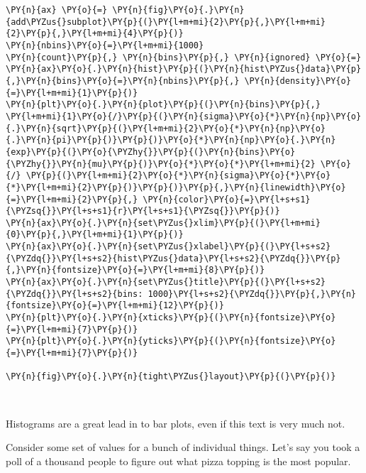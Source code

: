 \begin{tcolorbox}[breakable, size=fbox, boxrule=1pt, pad at break*=1mm,colback=cellbackground, colframe=cellborder]
\begin{Verbatim}[commandchars=\\\{\}]
\PY{n}{ax} \PY{o}{=} \PY{n}{fig}\PY{o}{.}\PY{n}{add\PYZus{}subplot}\PY{p}{(}\PY{l+m+mi}{2}\PY{p}{,}\PY{l+m+mi}{2}\PY{p}{,}\PY{l+m+mi}{4}\PY{p}{)}
\PY{n}{nbins}\PY{o}{=}\PY{l+m+mi}{1000}
\PY{n}{count}\PY{p}{,} \PY{n}{bins}\PY{p}{,} \PY{n}{ignored} \PY{o}{=} \PY{n}{ax}\PY{o}{.}\PY{n}{hist}\PY{p}{(}\PY{n}{hist\PYZus{}data}\PY{p}{,}\PY{n}{bins}\PY{o}{=}\PY{n}{nbins}\PY{p}{,} \PY{n}{density}\PY{o}{=}\PY{l+m+mi}{1}\PY{p}{)}
\PY{n}{plt}\PY{o}{.}\PY{n}{plot}\PY{p}{(}\PY{n}{bins}\PY{p}{,} \PY{l+m+mi}{1}\PY{o}{/}\PY{p}{(}\PY{n}{sigma}\PY{o}{*}\PY{n}{np}\PY{o}{.}\PY{n}{sqrt}\PY{p}{(}\PY{l+m+mi}{2}\PY{o}{*}\PY{n}{np}\PY{o}{.}\PY{n}{pi}\PY{p}{)}\PY{p}{)}\PY{o}{*}\PY{n}{np}\PY{o}{.}\PY{n}{exp}\PY{p}{(}\PY{o}{\PYZhy{}}\PY{p}{(}\PY{n}{bins}\PY{o}{\PYZhy{}}\PY{n}{mu}\PY{p}{)}\PY{o}{*}\PY{o}{*}\PY{l+m+mi}{2} \PY{o}{/} \PY{p}{(}\PY{l+m+mi}{2}\PY{o}{*}\PY{n}{sigma}\PY{o}{*}\PY{o}{*}\PY{l+m+mi}{2}\PY{p}{)}\PY{p}{)}\PY{p}{,}\PY{n}{linewidth}\PY{o}{=}\PY{l+m+mi}{2}\PY{p}{,} \PY{n}{color}\PY{o}{=}\PY{l+s+s1}{\PYZsq{}}\PY{l+s+s1}{r}\PY{l+s+s1}{\PYZsq{}}\PY{p}{)}
\PY{n}{ax}\PY{o}{.}\PY{n}{set\PYZus{}xlim}\PY{p}{(}\PY{l+m+mi}{0}\PY{p}{,}\PY{l+m+mi}{1}\PY{p}{)}
\PY{n}{ax}\PY{o}{.}\PY{n}{set\PYZus{}xlabel}\PY{p}{(}\PY{l+s+s2}{\PYZdq{}}\PY{l+s+s2}{hist\PYZus{}data}\PY{l+s+s2}{\PYZdq{}}\PY{p}{,}\PY{n}{fontsize}\PY{o}{=}\PY{l+m+mi}{8}\PY{p}{)}
\PY{n}{ax}\PY{o}{.}\PY{n}{set\PYZus{}title}\PY{p}{(}\PY{l+s+s2}{\PYZdq{}}\PY{l+s+s2}{bins: 1000}\PY{l+s+s2}{\PYZdq{}}\PY{p}{,}\PY{n}{fontsize}\PY{o}{=}\PY{l+m+mi}{12}\PY{p}{)}
\PY{n}{plt}\PY{o}{.}\PY{n}{xticks}\PY{p}{(}\PY{n}{fontsize}\PY{o}{=}\PY{l+m+mi}{7}\PY{p}{)}
\PY{n}{plt}\PY{o}{.}\PY{n}{yticks}\PY{p}{(}\PY{n}{fontsize}\PY{o}{=}\PY{l+m+mi}{7}\PY{p}{)}

\PY{n}{fig}\PY{o}{.}\PY{n}{tight\PYZus{}layout}\PY{p}{(}\PY{p}{)}
\end{Verbatim}
\end{tcolorbox}

    \begin{center}
    \end{center}
    { \hspace*{\fill} \\}
    
    Histograms are a great lead in to bar plots, even if this text is very
much not.

Consider some set of values for a bunch of individual things. Let's say
you took a poll of a thousand people to figure out what pizza topping is
the most popular.

